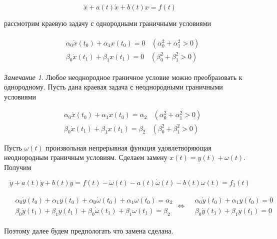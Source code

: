 \documentclass{article}
\theoremstyle{plain} \newtheorem*{theorem*}{Теорема}
\theoremstyle{plain} \newtheorem{theorem}{Теорема}[section]
\theoremstyle{defintition} \newtheorem*{corollary*}{Следствие}
\theoremstyle{remark} \newtheorem*{example*}{Пример}
\theoremstyle{remark} \newtheorem*{remark*}{Замечание}
\begin{document}
\begin{equation}
    \ddot{x} + a(t)\dot{x} + b(t)x = f(t)
\end{equation}

рассмотрим краевую задачу с однородными граничными условиями

\begin{gather}
\begin{split}
    & \alpha_0 \dot{x}(t_0) + \alpha_1 x(t_0) = 0
    \ \ \ \ (\alpha^2_0 + \alpha^2_1 > 0) \\
    & \beta_0 \dot{x}(t_1) + \beta_1 x(t_1) = 0
    \ \ \ \ (\beta^2_0 + \beta^2_1 > 0)
\end{split}
\end{gather}

\begin{remark*}
    Любое неоднородное граничное условие можно преобразовать
    к однородному. Пусть дана краевая задача с неоднородными
    граничными условиями

    \begin{align*}
    & \alpha_0 \dot{x}(t_0) + \alpha_1 x(t_0) = \alpha_2
        \ \ \ \ (\alpha^2_0 + \alpha^2_1 > 0) \\
    & \beta_0 \dot{x}(t_1) + \beta_1 x(t_1) = \beta_2
    \ \ \ \ (\beta^2_0 + \beta^2_1 > 0)
    \end{align*}

    Пусть $\omega(t)$ произвольная непрерывная функция
    удовлетворяющая неоднородным граничным условиям.
    Сделаем замену $x(t) = y(t) + \omega(t)$.
    Получим

    \begin{equation*}
        \ddot{y} + a(t)\dot{y} + b(t)y =
        f(t) - \ddot{\omega}(t) - a(t)\dot{\omega}(t) -
        b(t)\omega(t) = f_1(t)
    \end{equation*}

    \begin{gather*}
        \begin{aligned}
            & \alpha_0 \dot{y}(t_0) + \alpha_1 y(t_0) +
            \alpha_0 \dot{\omega}(t_0) + \alpha_1 \omega(t_0)
            = \alpha_2 \\
            & \beta_0 \dot{y}(t_1) + \beta_1 y(t_1) +
            \beta_0 \dot{\omega}(t_1) + \beta_1 \omega(t_1)
            = \beta_2
        \end{aligned}
        \iff
        \begin{aligned}
            & \alpha_0 \dot{y}(t_0) + \alpha_1 y(t_0) = 0 \\
            & \beta_0 \dot{y}(t_1) + \beta_1 y(t_1) = 0
        \end{aligned}
    \end{gather*}

    Поэтому далее будем предпологать что замена сделана.

\end{remark*}
\end{document}
